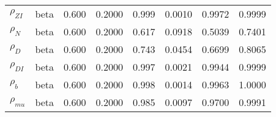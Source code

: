 \begin{center}
\begin{longtable}{llcccccc}
${\rho_{ZI}}$ & beta &   0.600 & 0.2000 &   0.999& 0.0010 &  0.9972 &  0.9999 \\ 
${\rho_N}$ & beta &   0.600 & 0.2000 &   0.617& 0.0918 &  0.5039 &  0.7401 \\ 
${\rho_D}$ & beta &   0.600 & 0.2000 &   0.743& 0.0454 &  0.6699 &  0.8065 \\ 
${\rho_{DI}}$ & beta &   0.600 & 0.2000 &   0.997& 0.0021 &  0.9944 &  0.9999 \\ 
${\rho_b}$ & beta &   0.600 & 0.2000 &   0.998& 0.0014 &  0.9963 &  1.0000 \\ 
${\rho_{mu}}$ & beta &   0.600 & 0.2000 &   0.985& 0.0097 &  0.9700 &  0.9991 \\ 
\end{longtable}
 \end{center}
